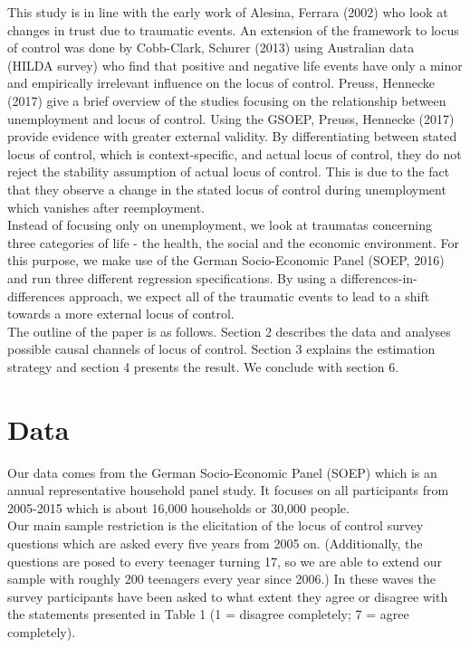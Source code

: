 \documentclass[12pt,a4paper,fleqn]{article}
\begin{document}
This study is in line with the early work of Alesina, Ferrara (2002) who look at changes in trust due to traumatic events. An extension of the framework to locus of control was done by Cobb-Clark, Schurer (2013) using Australian data (HILDA survey) who find that positive and negative life events have only a minor and empirically irrelevant  influence on the locus of control.
Preuss, Hennecke (2017) give a brief overview of the studies focusing on the relationship between unemployment and locus of control. Using the GSOEP, Preuss, Hennecke (2017) provide evidence with greater external validity. By differentiating between stated locus of control, which is context-specific, and actual locus of control, they do not reject the stability assumption of actual locus of control. This is due to the fact that they observe a change in the stated locus of control during unemployment which vanishes after reemployment. \\
Instead of focusing only on unemployment, we look at traumatas concerning three categories of life - the health, the social and the economic environment.  For this purpose, we make use of the German Socio-Economic Panel (SOEP, 2016) and run three different regression specifications. By using a differences-in-differences approach, we expect all of the traumatic events to lead to a shift towards a more external locus of control.\\
The outline of the paper is as follows. Section 2 describes the data and analyses possible causal channels of locus of control. Section 3 explains the estimation strategy and section 4 presents the result. We conclude with section 6.

\section{Data}
Our data comes from the German Socio-Economic Panel (SOEP) which is an annual representative household panel study. It focuses on all participants from 2005-2015 which is about 16,000 households or 30,000 people. \\
Our main sample restriction is the elicitation of the locus of control survey questions which are asked every five years from 2005 on. (Additionally, the questions are posed to every teenager turning 17, so we are able to extend our sample with roughly 200 teenagers every year since 2006.)
In these waves the survey participants have been asked to what extent they agree or disagree with the statements presented in Table 1 (1 = disagree completely; 7 = agree completely).\\
\end{document}
